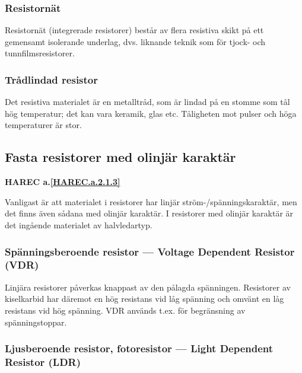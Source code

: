 \subsubsection{Resistornät}

Resistornät (integrerade resistorer) består av flera resistiva skikt på ett
gemensamt isolerande underlag, dvs. liknande teknik som för tjock- och
tunnfilmsresistorer.

\subsubsection{Trådlindad resistor}

Det resistiva materialet är en metalltråd, som är lindad på en stomme som tål
hög temperatur; det kan vara keramik, glas etc.
Tåligheten mot pulser och höga temperaturer är stor.

\subsection{Fasta resistorer med olinjär karaktär}
\textbf{HAREC a.\ref{HAREC.a.2.1.3}\label{myHAREC.a.2.1.3}}

Vanligast är att materialet i resistorer har linjär ström-/spänningskaraktär,
men det finns även sådana med olinjär karaktär. I resistorer med olinjär
karaktär är det ingående materialet av halvledartyp.

\subsubsection{Spänningsberoende resistor --- Voltage Dependent Resistor (VDR)}

Linjära resistorer påverkas knappast av den pålagda spänningen. Resistorer av
kiselkarbid har däremot en hög resistans vid låg spänning och omvänt en låg
resistans vid hög spänning. VDR används t.ex. för begränsning av
spänningstoppar.

\subsubsection{Ljusberoende resistor, fotoresistor --- Light Dependent Resistor (LDR)}

